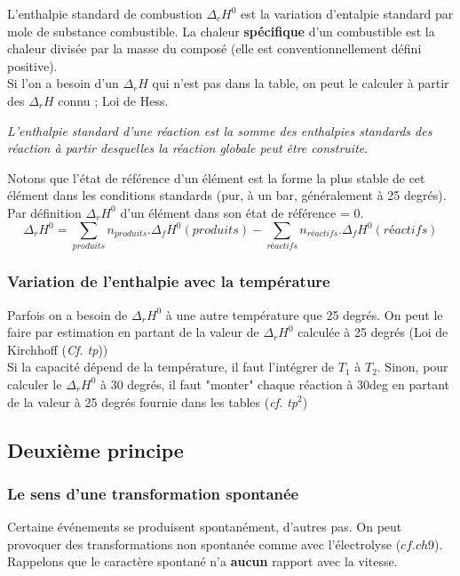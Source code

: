 \documentclass[12pt, a4paper]{article}
\begin{document}
L'enthalpie standard de combustion $\Delta_c H^0$ est la variation d'entalpie standard par mole de substance combustible.
La chaleur \textbf{spécifique} d'un combustible est la chaleur divisée par la masse du composé (elle est conventionnellement défini positive).\\

Si l'on a besoin d'un $\Delta_r H$ qui n'est pas dans la table, on peut le calculer à partir des $\Delta_r H$ connu ; Loi de Hess.
\begin{center}
\textit{L'enthalpie standard d'une réaction est la somme des enthalpies standards des réaction à partir desquelles la réaction globale peut être construite}.
\end{center}
Notons que l'état de référence d'un élément est la forme la plus stable de cet élément dans les conditions standards (pur, à un bar, généralement à 25 degrés).\\
Par définition $\Delta_r H^0$ d'un élément dans son état de référence = 0.
$$\Delta_r H^0 = \sum_{produits} n_{produits}.\Delta_f H^0(produits) - \sum_{réactifs} n_{réactifs}.\Delta_f H^0(réactifs)$$

\subsubsection{Variation de l'enthalpie avec la température}
Parfois on a besoin de $\Delta_r H^0$ à une autre température que 25 degrés. On peut le faire par estimation en partant de la valeur de $\Delta_r H^0$ calculée à 25 degrés (Loi de Kirchhoff (\textit{Cf. tp}))\\
Si la capacité dépend de la température, il faut l'intégrer de $T_1$ à $T_2$. Sinon, pour calculer le $\Delta_r H^0$ à 30 degrés, il faut "monter" chaque réaction à 30deg en partant de la valeur à 25 degrés fournie dans les tables (\textit{cf. tp}$^2$)

\subsection{Deuxième principe}
\subsubsection{Le sens d'une transformation spontanée}
Certaine événements se produisent spontanément, d'autres pas. On peut provoquer des transformations non spontanée comme avec l'électrolyse ($cf. ch9$). Rappelons que le caractère spontané n'a \textbf{aucun} rapport avec la vitesse.\\
\end{document}
